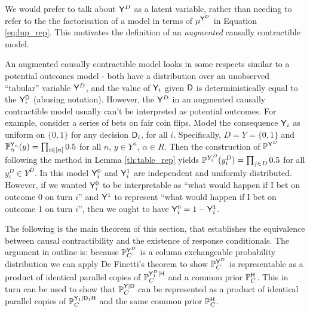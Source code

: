 We would prefer to talk about $\mathsf{Y}^D$ as a latent variable, rather than needing to refer to the the factorisation of a model in terms of $\mu^{\mathsf{Y}^D}$ in Equation \ref{eq:lup_rep}. This motivates the definition of an \emph{augmented} causally contractible model.

An augmented causally contractible model looks in some respects similar to a potential outcomes model - both have a distribution over an unobserved ``tabular'' variable $\mathsf{Y}^D$, and the value of $\mathsf{Y}_i$ given $\mathsf{D}$ is deterministically equal to the $\mathsf{Y}_i^{\mathsf{D}}$ (abusing notation). However, the $\mathsf{Y}^D$ in an augmented causally contractible model usually can't be interpreted as potential outcomes. For example, consider a series of bets on fair coin flips. Model the consequence $\mathsf{Y}_i$ as uniform on $\{0,1\}$ for any decision $\mathsf{D}_i$, for all $i$. Specifically, $D=Y=\{0,1\}$ and $\mathbb{P}_\alpha^{\mathsf{Y}_n}(y)=\prod_{i\in [n]} 0.5$ for all $n$, $y\in Y^n$, $\alpha\in R$. Then the construction of $\mathbb{P}^{\mathsf{Y}^D}$ following the method in Lemma \ref{th:table_rep} yields $\mathbb{P}^{Y^D_i}(y^D_i)=\prod_{j\in D} 0.5$ for all $y^D_i\in Y^D$. In this model $\mathsf{Y}^0_i$ and $\mathsf{Y}^1_i$ are independent and uniformly distributed. However, if we wanted $\mathsf{Y}^0_i$ to be interpretable as ``what would happen if I bet on outcome 0 on turn $i$'' and $\mathsf{Y}^1$ to represent ``what would happen if I bet on outcome 1 on turn $i$'', then we ought to have $\mathsf{Y}^0_i = 1-\mathsf{Y}^1_i$.

The following is the main theorem of this section, that establishes the equivalence between causal contractibility and the existence of response conditionals. The argument in outline is: because $\mathbb{P}_C^{\mathsf{Y}^D}$ is a column exchangeable probability distribution we can apply De Finetti's theorem to show $\mathbb{P}_C^{\mathsf{Y}^D}$ is representable as a product of identical parallel copies of $\mathbb{P}_C^{\mathsf{Y}_1^D|\mathsf{H}}$ and a common prior $\mathbb{P}_C^{\mathsf{H}}$. This in turn can be used to show that $\mathbb{P}_C^{\mathsf{Y}|\mathsf{D}}$ can be represented as a product of identical parallel copies of $\mathbb{P}_C^{\mathsf{Y}_1|\mathsf{D}_1\mathsf{H}}$ and the same common prior $\mathbb{P}_C^{\mathsf{H}}$.

